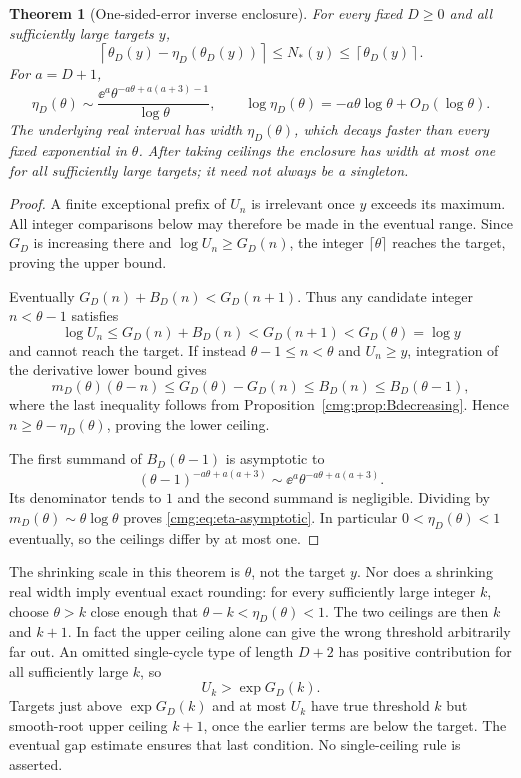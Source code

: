 \documentclass[11pt,letterpaper]{article}
\numberwithin{equation}{section}
\newtheorem{theorem}{Theorem}[section]
\theoremstyle{definition}\newtheorem{definition}[theorem]{Definition}
\theoremstyle{remark}\newtheorem{remark}[theorem]{Remark}
\begin{document}
\begin{theorem}[One-sided-error inverse enclosure]\label{cmg:thm:inverse}
For every fixed $D\ge0$ and all sufficiently large targets $y$,
\begin{equation}\label{cmg:eq:ceilings}
 \left\lceil\theta_D(y)-\eta_D(\theta_D(y))\right\rceil
 \le N_*(y)\le\left\lceil\theta_D(y)\right\rceil.
\end{equation}
For $a=D+1$,
\begin{equation}\label{cmg:eq:eta-asymptotic}
 \eta_D(\theta)\sim
 \frac{\ee^a\theta^{-a\theta+a(a+3)-1}}{\log\theta},\qquad
 \log\eta_D(\theta)=-a\theta\log\theta+O_D(\log\theta).
\end{equation}
The underlying real interval has width $\eta_D(\theta)$, which decays faster than every fixed exponential in $\theta$. After taking ceilings the enclosure has width at most one for all sufficiently large targets; it need not always be a singleton.
\end{theorem}
\begin{proof}
A finite exceptional prefix of $U_n$ is irrelevant once $y$ exceeds its maximum. All integer comparisons below may therefore be made in the eventual range. Since $G_D$ is increasing there and $\log U_n\ge G_D(n)$, the integer $\lceil\theta\rceil$ reaches the target, proving the upper bound.

Eventually $G_D(n)+B_D(n)<G_D(n+1)$. Thus any candidate integer $n<\theta-1$ satisfies
\[
 \log U_n\le G_D(n)+B_D(n)<G_D(n+1)<G_D(\theta)=\log y
\]
and cannot reach the target. If instead $\theta-1\le n<\theta$ and $U_n\ge y$, integration of the derivative lower bound gives
\[
 m_D(\theta)(\theta-n)\le G_D(\theta)-G_D(n)
 \le B_D(n)\le B_D(\theta-1),
\]
where the last inequality follows from Proposition~\ref{cmg:prop:Bdecreasing}. Hence $n\ge\theta-\eta_D(\theta)$, proving the lower ceiling.

The first summand of $B_D(\theta-1)$ is asymptotic to
\[
 (\theta-1)^{-a\theta+a(a+3)}
 \sim\ee^a\theta^{-a\theta+a(a+3)}.
\]
Its denominator tends to $1$ and the second summand is negligible. Dividing by $m_D(\theta)\sim\theta\log\theta$ proves \eqref{cmg:eq:eta-asymptotic}. In particular $0<\eta_D(\theta)<1$ eventually, so the ceilings differ by at most one.
\end{proof}

The shrinking scale in this theorem is $\theta$, not the target $y$. Nor does a shrinking real width imply eventual exact rounding: for every sufficiently large integer $k$, choose $\theta>k$ close enough that $\theta-k<\eta_D(\theta)<1$. The two ceilings are then $k$ and $k+1$. In fact the upper ceiling alone can give the wrong threshold arbitrarily far out. An omitted single-cycle type of length $D+2$ has positive contribution for all sufficiently large $k$, so
\[
 U_k>\exp G_D(k).
\]
Targets just above $\exp G_D(k)$ and at most $U_k$ have true threshold $k$ but smooth-root upper ceiling $k+1$, once the earlier terms are below the target. The eventual gap estimate ensures that last condition. No single-ceiling rule is asserted.
\end{document}
